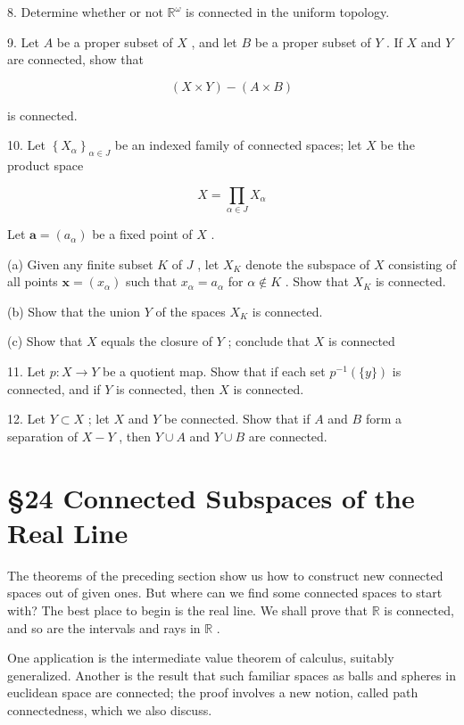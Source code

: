 \documentclass[10pt]{article}
\begin{document}
8. Determine whether or not \({\mathbb{R}}^{\omega }\) is connected in the uniform topology.

9. Let \(A\) be a proper subset of \(X\) , and let \(B\) be a proper subset of \(Y\) . If \(X\) and \(Y\) are connected, show that

\[
\left( {X \times  Y}\right)  - \left( {A \times  B}\right)
\]

is connected.

10. Let \({\left\{  {X}_{\alpha }\right\}  }_{\alpha  \in  J}\) be an indexed family of connected spaces; let \(X\) be the product space

\[
X = \mathop{\prod }\limits_{{\alpha  \in  J}}{X}_{\alpha }
\]

Let \(\mathbf{a} = \left( {a}_{\alpha }\right)\) be a fixed point of \(X\) .

(a) Given any finite subset \(K\) of \(J\) , let \({X}_{K}\) denote the subspace of \(X\) consisting of all points \(\mathbf{x} = \left( {x}_{\alpha }\right)\) such that \({x}_{\alpha } = {a}_{\alpha }\) for \(\alpha  \notin  K\) . Show that \({X}_{K}\) is connected.

(b) Show that the union \(Y\) of the spaces \({X}_{K}\) is connected.

(c) Show that \(X\) equals the closure of \(Y\) ; conclude that \(X\) is connected

11. Let \(p : X \rightarrow  Y\) be a quotient map. Show that if each set \({p}^{-1}\left( {\{ y\} }\right)\) is connected, and if \(Y\) is connected, then \(X\) is connected.

12. Let \(Y \subset  X\) ; let \(X\) and \(Y\) be connected. Show that if \(A\) and \(B\) form a separation of \(X - Y\) , then \(Y \cup  A\) and \(Y \cup  B\) are connected.

\section*{§24 Connected Subspaces of the Real Line}

The theorems of the preceding section show us how to construct new connected spaces out of given ones. But where can we find some connected spaces to start with? The best place to begin is the real line. We shall prove that \(\mathbb{R}\) is connected, and so are the intervals and rays in \(\mathbb{R}\) .

One application is the intermediate value theorem of calculus, suitably generalized. Another is the result that such familiar spaces as balls and spheres in euclidean space are connected; the proof involves a new notion, called path connectedness, which we also discuss.
\end{document}
